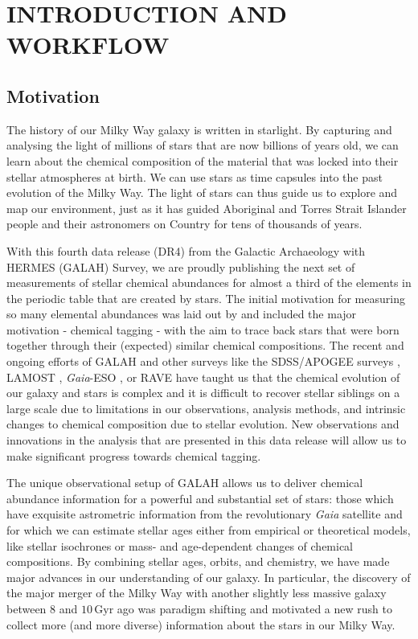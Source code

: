 \documentclass[
  journal=pasa,
  manuscript=research-paper, %
  year=2024,
  volume=37
]{cup-journal}
\newcommand{\Gaia}{\textit{Gaia}\xspace}
\begin{document}
\section{INTRODUCTION AND WORKFLOW}
\label{sec:introduction}

\subsection{Motivation} \label{sec:motivation}

The history of our Milky Way galaxy is written in starlight. By capturing and analysing the light of millions of stars that are now billions of years old, we can learn about the chemical composition of the material that was locked into their stellar atmospheres at birth. We can use stars as time capsules into the past evolution of the Milky Way. The light of stars can thus guide us to explore and map our environment, just as it has guided Aboriginal and Torres Strait Islander people and their astronomers on Country for tens of thousands of years.

With this fourth data release (DR4) from the Galactic Archaeology with HERMES (GALAH) Survey, we are proudly publishing the next set of measurements of stellar chemical abundances for almost a third of the elements in the periodic table that are created by stars. The initial motivation for measuring so many elemental abundances was laid out by \citet{DeSilva2015} and included the major motivation - chemical tagging - with the aim to trace back stars that were born together through their (expected) similar chemical compositions. The recent and ongoing efforts of GALAH and other surveys like the SDSS/APOGEE surveys \citep[e.g.][]{SDSSDR17, Kollmeier2017}, LAMOST \citep{Zhao2012}, \Gaia-ESO \citep{Gilmore2022}, or RAVE \citep{Steinmetz2020a} have taught us that the chemical evolution of our galaxy and stars is complex and it is difficult to recover stellar siblings on a large scale due to limitations in our observations, analysis methods, and intrinsic changes to chemical composition due to stellar evolution. New observations and innovations in the analysis that are presented in this data release will allow us to make significant progress towards chemical tagging.

The unique observational setup of GALAH allows us to deliver chemical abundance information for a powerful and substantial set of stars: those which have exquisite astrometric information from the revolutionary \Gaia satellite \citep{Gaia-Collaboration2016} and for which we can estimate stellar ages either from empirical or theoretical models, like stellar isochrones or mass- and age-dependent changes of chemical compositions. By combining stellar ages, orbits, and chemistry, we have made major advances in our understanding of our galaxy. In particular, the discovery of the major merger of the Milky Way with another slightly less massive galaxy between 8 and $10\,\mathrm{Gyr}$ ago \citep{Belokurov2018, Helmi2018} was paradigm shifting and motivated a new rush to collect more (and more diverse) information about the stars in our Milky Way.
\end{document}
